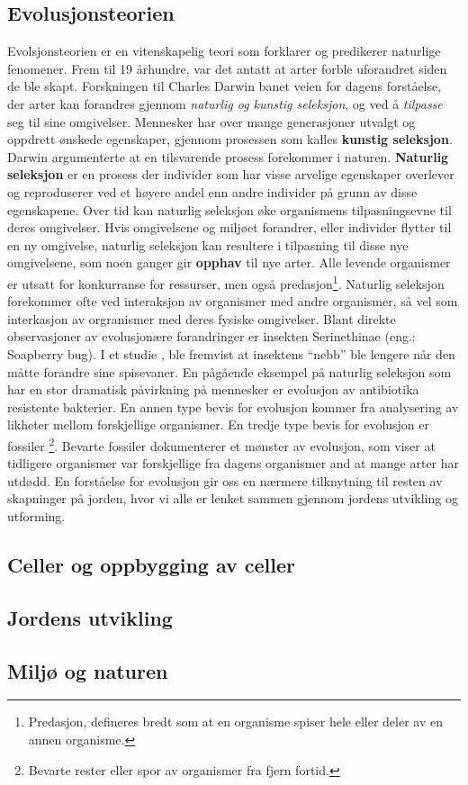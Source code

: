 \documentclass[main.tex]{subfiles}
\begin{document}
\subsection{Evolusjonsteorien}
Evolsjonsteorien er en vitenskapelig teori som forklarer og predikerer naturlige fenomener. Frem til 19 århundre, var det antatt at arter forble uforandret siden de ble skapt. Forskningen til Charles Darwin banet veien for dagens forståelse, der arter kan forandres gjennom \emph{naturlig og kunstig seleksjon}, og ved å \emph{tilpasse} seg til sine omgivelser.
\newline\newline
Mennesker har over mange generasjoner utvalgt og oppdrett ønskede egenskaper, gjennom prosessen som kalles \textbf{kunstig seleksjon}. Darwin argumenterte at en tilsvarende prosess forekommer i naturen. \textbf{Naturlig seleksjon} er en prosess der individer som har visse arvelige egenskaper overlever og reproduserer ved et høyere andel enn andre individer på grunn av disse egenskapene. Over tid kan naturlig seleksjon øke organismens tilpasningsevne til deres omgivelser. Hvis omgivelsene og miljøet forandrer, eller individer flytter til en ny omgivelse, naturlig seleksjon kan resultere i tilpasning til disse nye omgivelsene, som noen ganger gir \textbf{opphav} til nye arter.
\newline\newline
Alle levende organismer er utsatt for konkurranse for ressurser, men også predasjon\footnote{Predasjon, defineres bredt som at en organisme spiser hele eller deler av en annen organisme.}. Naturlig seleksjon forekommer ofte ved interaksjon av organismer med andre organismer, så vel som interkasjon av orgranismer med deres fysiske omgivelser.
\newline\newline
Blant direkte observasjoner av evolusjonære forandringer er insekten Serinethinae (eng.: Soapberry bug). I et studie \cite{cabo92}, ble fremvist at insektens ``nebb'' ble lengere når den måtte forandre sine spisevaner. En pågående eksempel på naturlig seleksjon som har en stor dramatisk påvirkning på mennesker er evolusjon av antibiotika resistente bakterier. En annen type bevis for evolusjon kommer fra analysering av likheter mellom forskjellige organismer. En tredje type bevis for evolusjon er fossiler \footnote{Bevarte rester eller spor av organismer fra fjern fortid.}. Bevarte fossiler dokumenterer et mønster av evolusjon, som viser at tidligere organismer var forskjellige fra dagens organismer and at mange arter har utdødd.
\newline\newline
En forståelse for evolusjon gir oss en nærmere tilknytning til resten av skapninger på jorden, hvor vi alle er lenket sammen gjennom jordens utvikling og utforming. 

\subsection{Celler og oppbygging av celler}

\subsection{Jordens utvikling}

\subsection{Miljø og naturen}
\end{document}
